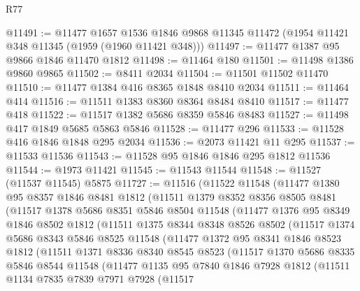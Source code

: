 \begin{lexlean}{R77}
\begin{coremodule}
@11491 := @11477
    @1657
    @1536
    @1846
    @9868
    @11345
    @11472
    (@1954 @11421 @348 @11345 (@1959 (@1960 @11421 @348)))
@11497 := @11477 @1387 @95 @9866 @1846 @11470 @1812
@11498 := @11464 @180
@11501 := @11498 @1386 @9860 @9865
@11502 := @8411 @2034
@11504 := @11501 @11502 @11470
@11510 := @11477 @1384 @416 @8365 @1848 @8410 @2034
@11511 := @11464 @414
@11516 := @11511 @1383 @8360 @8364 @8484 @8410
@11517 := @11477 @418
@11522 := @11517 @1382 @5686 @8359 @5846 @8483
@11527 := @11498 @417 @1849 @5685 @5863 @5846
@11528 := @11477 @296
@11533 := @11528 @416 @1846 @1848 @295 @2034
@11536 := @2073 @11421 @11 @295
@11537 := @11533 @11536
@11543 := @11528 @95 @1846 @1846 @295 @1812 @11536
@11544 := @1973 @11421
@11545 := @11543 @11544
@11548 := @11527 (@11537 @11545) @5875
@11727 := @11516
    (@11522
      @11548
      (@11477
        @1380
        @95
        @8357
        @1846
        @8481
        @1812
        (@11511
          @1379
          @8352
          @8356
          @8505
          @8481
          (@11517
            @1378
            @5686
            @8351
            @5846
            @8504
            @11548
            (@11477
              @1376
              @95
              @8349
              @1846
              @8502
              @1812
              (@11511
                @1375
                @8344
                @8348
                @8526
                @8502
                (@11517
                  @1374
                  @5686
                  @8343
                  @5846
                  @8525
                  @11548
                  (@11477
                    @1372
                    @95
                    @8341
                    @1846
                    @8523
                    @1812
                    (@11511
                      @1371
                      @8336
                      @8340
                      @8545
                      @8523
                      (@11517
                        @1370
                        @5686
                        @8335
                        @5846
                        @8544
                        @11548
                        (@11477
                          @1135
                          @95
                          @7840
                          @1846
                          @7928
                          @1812
                          (@11511
                            @1134
                            @7835
                            @7839
                            @7971
                            @7928
                            (@11517

\end{coremodule}
\end{lexlean}
